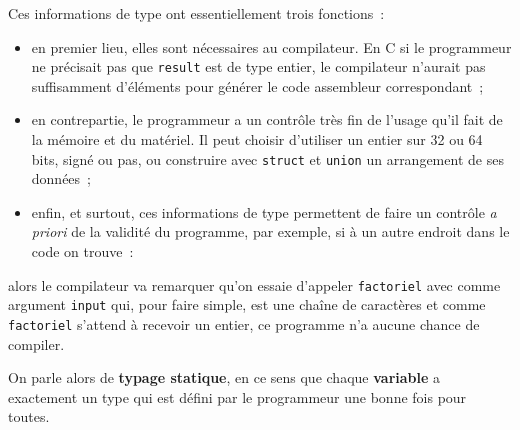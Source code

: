     Ces informations de type ont essentiellement trois fonctions~:

\begin{itemize}
\tightlist
\item
  en premier lieu, elles sont nécessaires au compilateur. En C si le
  programmeur ne précisait pas que \texttt{result} est de type entier,
  le compilateur n'aurait pas suffisamment d'éléments pour générer le
  code assembleur correspondant~;
\item
  en contrepartie, le programmeur a un contrôle très fin de l'usage
  qu'il fait de la mémoire et du matériel. Il peut choisir d'utiliser un
  entier sur 32 ou 64 bits, signé ou pas, ou construire avec
  \texttt{struct} et \texttt{union} un arrangement de ses données~;
\item
  enfin, et surtout, ces informations de type permettent de faire un
  contrôle \emph{a priori} de la validité du programme, par exemple, si
  à un autre endroit dans le code on trouve~:
\end{itemize}

    \begin{Shaded}
\end{Shaded}

    alors le compilateur va remarquer qu'on essaie d'appeler
\texttt{factoriel} avec comme argument \texttt{input} qui, pour faire
simple, est une chaîne de caractères et comme \texttt{factoriel}
s'attend à recevoir un entier, ce programme n'a aucune chance de
compiler.

On parle alors de \textbf{typage statique}, en ce sens que chaque
\textbf{variable} a exactement un type qui est défini par le programmeur
une bonne fois pour toutes.

